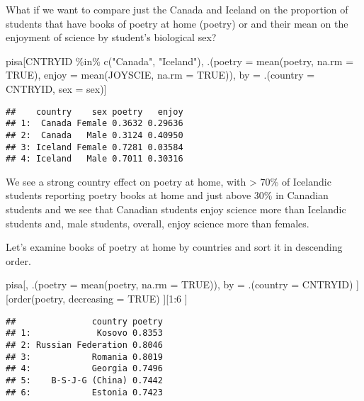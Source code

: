 \documentclass[
]{book}
\newenvironment{Shaded}{\begin{snugshade}}{\end{snugshade}}
\newcommand{\AttributeTok}[1]{\textcolor[rgb]{0.77,0.63,0.00}{#1}}
\newcommand{\ConstantTok}[1]{\textcolor[rgb]{0.00,0.00,0.00}{#1}}
\newcommand{\DecValTok}[1]{\textcolor[rgb]{0.00,0.00,0.81}{#1}}
\newcommand{\FunctionTok}[1]{\textcolor[rgb]{0.00,0.00,0.00}{#1}}
\newcommand{\NormalTok}[1]{#1}
\newcommand{\OtherTok}[1]{\textcolor[rgb]{0.56,0.35,0.01}{#1}}
\newcommand{\SpecialCharTok}[1]{\textcolor[rgb]{0.00,0.00,0.00}{#1}}
\newcommand{\StringTok}[1]{\textcolor[rgb]{0.31,0.60,0.02}{#1}}
\begin{document}
What if we want to compare just the Canada and Iceland on the proportion of students that have books of poetry at home (poetry) or and their mean on the enjoyment of science by student's biological sex?

\begin{Shaded}
\begin{Highlighting}[]
\NormalTok{pisa[CNTRYID }\SpecialCharTok{\%in\%} \FunctionTok{c}\NormalTok{(}\StringTok{"Canada"}\NormalTok{, }\StringTok{"Iceland"}\NormalTok{),}
\NormalTok{     .(}\AttributeTok{poetry =} \FunctionTok{mean}\NormalTok{(poetry, }\AttributeTok{na.rm =} \ConstantTok{TRUE}\NormalTok{),}
       \AttributeTok{enjoy =} \FunctionTok{mean}\NormalTok{(JOYSCIE, }\AttributeTok{na.rm =} \ConstantTok{TRUE}\NormalTok{)),}
\NormalTok{     by }\OtherTok{=}\NormalTok{ .(}\AttributeTok{country =}\NormalTok{ CNTRYID, }\AttributeTok{sex =}\NormalTok{ sex)]}
\end{Highlighting}
\end{Shaded}

\begin{verbatim}
##    country    sex poetry   enjoy
## 1:  Canada Female 0.3632 0.29636
## 2:  Canada   Male 0.3124 0.40950
## 3: Iceland Female 0.7281 0.03584
## 4: Iceland   Male 0.7011 0.30316
\end{verbatim}

We see a strong country effect on poetry at home, with \textgreater{} 70\% of Icelandic students reporting poetry books at home and just above 30\% in Canadian students and we see that Canadian students enjoy science more than Icelandic students and, male students, overall, enjoy science more than females.

Let's examine books of poetry at home by countries and sort it in descending order.

\begin{Shaded}
\begin{Highlighting}[]
\NormalTok{pisa[,}
\NormalTok{     .(}\AttributeTok{poetry =} \FunctionTok{mean}\NormalTok{(poetry, }\AttributeTok{na.rm =} \ConstantTok{TRUE}\NormalTok{)),}
\NormalTok{     by }\OtherTok{=}\NormalTok{ .(}\AttributeTok{country =}\NormalTok{ CNTRYID)}
\NormalTok{     ][}\FunctionTok{order}\NormalTok{(poetry, }\AttributeTok{decreasing =} \ConstantTok{TRUE}\NormalTok{)}
\NormalTok{       ][}\DecValTok{1}\SpecialCharTok{:}\DecValTok{6}
\NormalTok{         ]}
\end{Highlighting}
\end{Shaded}

\begin{verbatim}
##               country poetry
## 1:             Kosovo 0.8353
## 2: Russian Federation 0.8046
## 3:            Romania 0.8019
## 4:            Georgia 0.7496
## 5:    B-S-J-G (China) 0.7442
## 6:            Estonia 0.7423
\end{verbatim}
\end{document}
